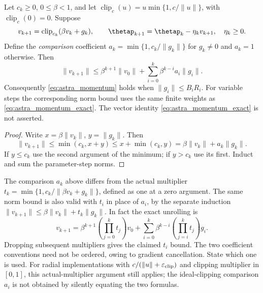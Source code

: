 \begin{lemma}
\label{lem:astra_velocity}
Let $c_k\ge0$, $0\le\beta<1$, and let
$\operatorname{clip}_{c}(u)=u\min\{1,c/\|u\|\}$, with
$\operatorname{clip}_{c}(0)=0$. Suppose
\[
 v_{k+1}=\operatorname{clip}_{c_k}(\beta v_k+g_k),\qquad
 \thetap_{k+1}=\thetap_k-\eta_kv_{k+1},\quad \eta_k\ge0.
\]
Define the \emph{comparison} coefficient
$a_k=\min\{1,c_k/\|g_k\|\}$ for $g_k\ne0$ and $a_k=1$ otherwise.
Then
\[
 \|v_{k+1}\|\le\beta^{k+1}\|v_0\|
       +\sum_{i=0}^k\beta^{k-i}a_i\|g_i\|.
\]
Consequently \eqref{eq:astra_momentum} holds when
$\|g_i\|\le B_iR_i$. For variable steps the corresponding norm bound
uses the same finite weights as \eqref{eq:astra_momentum_exact}.
The vector identity \eqref{eq:astra_momentum_exact} is not asserted.
\end{lemma}
\begin{proof}
Write $x=\beta\|v_k\|$, $y=\|g_k\|$. Then
\[
 \|v_{k+1}\|\le\min(c_k,x+y)\le x+\min(c_k,y)
 =\beta\|v_k\|+a_k\|g_k\|.
\]
If $y\le c_k$ use the second argument of the minimum; if $y>c_k$ use
its first. Induct and sum the parameter-step norms.
\end{proof}
\begin{remark}
The comparison $a_k$ above differs from the actual multiplier
$t_k=\min\{1,c_k/\|\beta v_k+g_k\|\}$, defined as one at a zero
argument. The same norm bound is also valid with $t_i$ in place of
$a_i$, by the separate induction
$\|v_{k+1}\|\le\beta\|v_k\|+t_k\|g_k\|$.
In fact the exact unrolling is
\[
 v_{k+1}=\beta^{k+1}\left(\prod_{j=0}^kt_j\right)v_0
 +\sum_{i=0}^k\beta^{k-i}\left(\prod_{j=i}^kt_j\right)g_i.
\]
Dropping subsequent multipliers gives the claimed $t_i$ bound.
The two coefficient conventions need not be ordered, owing to gradient
cancellation. State which one is used. For radial implementations with
$c/(\|u\|+\varepsilon_{\rm clip})$ and clipping multiplier in $[0,1]$,
this actual-multiplier argument still applies; the ideal-clipping
comparison $a_i$ is not obtained by silently equating the two formulas.
\end{remark}

